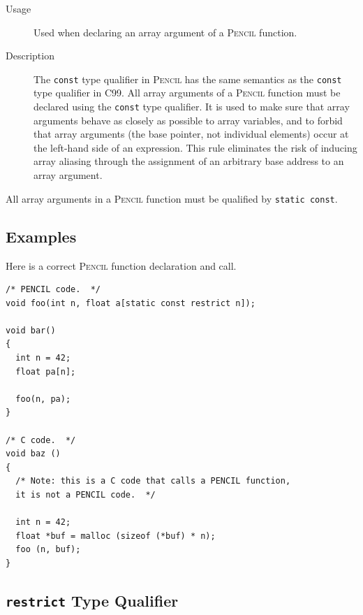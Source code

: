 \documentclass{carp}
\newcommand\pencil{\textsc{Pencil}\xspace}
\begin{document}
\begin{description}
\item [Usage] Used when declaring an array argument of a \pencil function.
\item [Description] The \lstinline!const! type qualifier in \pencil
has the same semantics as the \lstinline!const! type qualifier in C99.
All array arguments of a \pencil function
must be declared using the \lstinline!const! type qualifier.
It is used to make sure that array arguments behave as closely as possible to
array variables, and to forbid that array arguments (the base
pointer, not individual elements) occur at the left-hand side of an
expression.  This rule eliminates the risk of inducing array aliasing
through the assignment of an arbitrary base address to an array
argument.
\end{description}

All array arguments in a \pencil function must be
qualified by \lstinline!static const!.

\subsection*{Examples}

Here is a correct \pencil function declaration and call.

\begin{lstlisting}[language=pencil]
/* PENCIL code.  */
void foo(int n, float a[static const restrict n]);

void bar()
{
  int n = 42;
  float pa[n];

  foo(n, pa);
}

/* C code.  */
void baz ()
{
  /* Note: this is a C code that calls a PENCIL function,
  it is not a PENCIL code.  */

  int n = 42;
  float *buf = malloc (sizeof (*buf) * n);
  foo (n, buf);
}
\end{lstlisting}

\subsection{\lstinline!restrict! Type Qualifier}
\label{sec:restrict}

\end{document}
